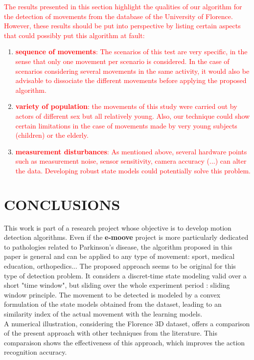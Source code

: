 \documentclass[letterpaper, 10 pt, conference]{ieeeconf}  %
\begin{document}
\textcolor{red}{The results presented in this section highlight the qualities of our algorithm for the detection of movements from the database of the University of Florence. However, these results should be put into perspective by listing certain aspects that could possibly put this algorithm at fault:}

\begin{enumerate}
\item \textcolor{red}{\textbf{sequence of movements}: The scenarios of this test are very specific, in the sense that only one movement per scenario is considered. In the case of scenarios considering several movements in the same activity, it would also be advisable to dissociate the different movements before applying the proposed algorithm.}
\item \textcolor{red}{\textbf{variety of population}: the movements of this study were carried out by actors of different sex but all relatively young. Also, our technique could show certain limitations in the case of movements made by very young subjects (children) or the elderly.}
\item \textcolor{red}{\textbf{measurement disturbances}: As mentioned above, several hardware points such as measurement noise, sensor sensitivity, camera accuracy (...) can alter the data. Developing robust state models could potentially solve this problem.}
\end{enumerate}

\section{CONCLUSIONS}

This work is part of a research project whose objective is to develop motion detection algorithms. Even if the \textbf{e-moove} project is more particularly dedicated to pathologies related to Parkinson's disease, the algorithm proposed in this paper is general and can be applied to any type of movement: sport, medical education, orthopedics... The proposed approach seems to be original for this type of detection problem. It considers a discret-time state modeling valid over a short "time window", but sliding over the whole experiment period : sliding window principle. The movement to be detected is modeled by a convex formulation of the state models obtained from the dataset, leading to an similarity index of the actual movement with the learning models.\\
A numerical illustration, considering the Florence 3D dataset, offers a comparison of the present approach with other techniques from the literature. This comparaison shows the effectiveness of this approach, which improves the action recognition accuracy.
\end{document}
